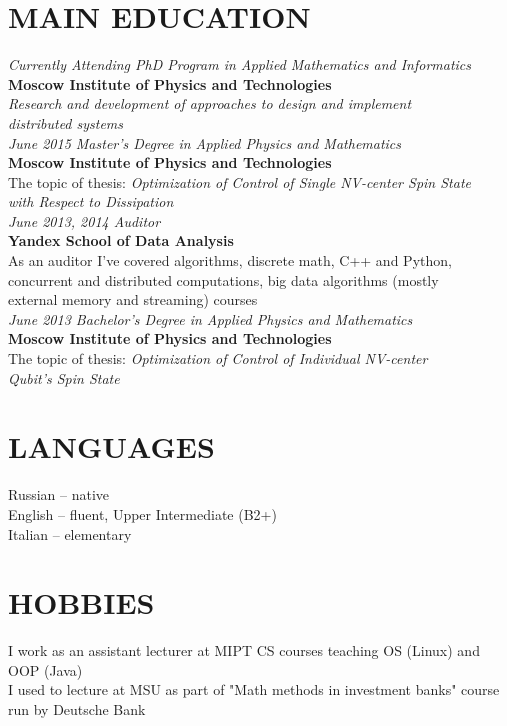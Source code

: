 \documentclass[margin,12pt]{res}
\begin{document}
\begin{resume}
\section{MAIN EDUCATION}
\textit{Currently Attending PhD Program in Applied Mathematics and Informatics\\}
\textbf{Moscow Institute of Physics and Technologies}\\
\textit{Research and development of approaches to design and implement\\
 distributed systems}\\
\newline
\textit{June 2015 Master's Degree in Applied Physics and Mathematics\\}
\textbf{Moscow Institute of Physics and Technologies}\\
The topic of thesis: \textit{Optimization of Control of Single NV-center Spin State \\
with Respect to Dissipation}\\
\newline
\textit{June 2013, 2014 Auditor\\}
\textbf{Yandex School of Data Analysis}\\
As an auditor I've covered algorithms, discrete math, C++ and Python,\\
concurrent and distributed computations, big data algorithms (mostly\\
external memory and streaming) courses\\
\newline
\newline
\textit{June 2013 Bachelor's Degree in Applied Physics and Mathematics\\}
\textbf{Moscow Institute of Physics and Technologies}\\
The topic of thesis: \textit{Optimization of Control of Individual NV-center\\ 
Qubit's Spin State}

\section{LANGUAGES}
Russian -- native\\
English -- fluent, Upper Intermediate (B2+)\\
Italian -- elementary

\section{HOBBIES}
I work as an assistant lecturer at MIPT CS courses teaching OS (Linux) and\\
 OOP (Java)\\
I used to lecture at MSU as part of "Math methods in investment banks" course\\
run by Deutsche Bank

\end{resume}
\end{document}
